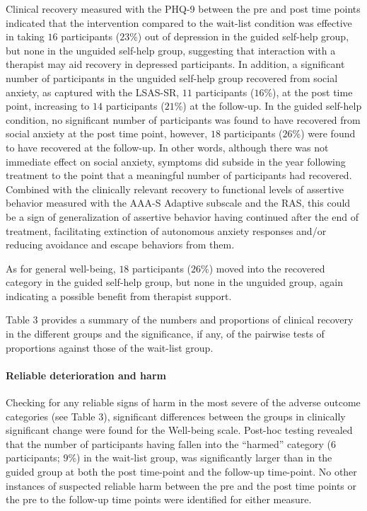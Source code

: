 \documentclass[preprint,
3p]{elsarticle} %
\begin{document}
Clinical recovery measured with the PHQ-9 between the pre and post time
points indicated that the intervention compared to the wait-list
condition was effective in taking \(16\) participants (\(23\)\%) out of
depression in the guided self-help group, but none in the unguided
self-help group, suggesting that interaction with a therapist may aid
recovery in depressed participants. In addition, a significant number of
participants in the unguided self-help group recovered from social
anxiety, as captured with the LSAS-SR, \(11\) participants (\(16\)\%),
at the post time point, increasing to \(14\) participants (\(21\)\%) at
the follow-up. In the guided self-help condition, no significant number
of participants was found to have recovered from social anxiety at the
post time point, however, \(18\) participants (\(26\)\%) were found to
have recovered at the follow-up. In other words, although there was not
immediate effect on social anxiety, symptoms did subside in the year
following treatment to the point that a meaningful number of
participants had recovered. Combined with the clinically relevant
recovery to functional levels of assertive behavior measured with the
AAA-S Adaptive subscale and the RAS, this could be a sign of
generalization of assertive behavior having continued after the end of
treatment, facilitating extinction of autonomous anxiety responses
and/or reducing avoidance and escape behaviors from them.

As for general well-being, \(18\) participants (\(26\)\%) moved into the
recovered category in the guided self-help group, but none in the
unguided group, again indicating a possible benefit from therapist
support.

Table 3 provides a summary of the numbers and proportions of clinical
recovery in the different groups and the significance, if any, of the
pairwise tests of proportions against those of the wait-list group.

\hypertarget{reliable-deterioration-and-harm}{%
\paragraph{Reliable deterioration and
harm}\label{reliable-deterioration-and-harm}}

Checking for any reliable signs of harm in the most severe of the
adverse outcome categories (see Table 3), significant differences
between the groups in clinically significant change were found for the
Well-being scale. Post-hoc testing revealed that the number of
participants having fallen into the ``harmed'' category (\(6\)
participants; \(9\)\%) in the wait-list group, was significantly larger
than in the guided group at both the post time-point and the follow-up
time-point. No other instances of suspected reliable harm between the
pre and the post time points or the pre to the follow-up time points
were identified for either measure.
\end{document}
